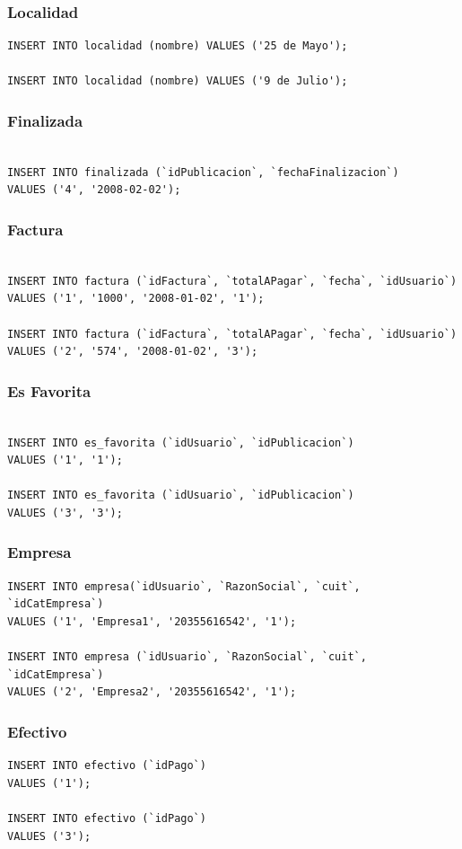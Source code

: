 \documentclass[a4paper, 10pt, twoside]{article}
\begin{document}
\subsubsection{Localidad}
\begin{verbatim}
INSERT INTO localidad (nombre) VALUES ('25 de Mayo');

INSERT INTO localidad (nombre) VALUES ('9 de Julio');
\end{verbatim}
\subsubsection{Finalizada}
\begin{verbatim}

INSERT INTO finalizada (`idPublicacion`, `fechaFinalizacion`) 
VALUES ('4', '2008-02-02');
\end{verbatim}
\newpage
\subsubsection{Factura}
\begin{verbatim}

INSERT INTO factura (`idFactura`, `totalAPagar`, `fecha`, `idUsuario`) 
VALUES ('1', '1000', '2008-01-02', '1');

INSERT INTO factura (`idFactura`, `totalAPagar`, `fecha`, `idUsuario`) 
VALUES ('2', '574', '2008-01-02', '3');
\end{verbatim}
\subsubsection{Es Favorita}
\begin{verbatim}

INSERT INTO es_favorita (`idUsuario`, `idPublicacion`) 
VALUES ('1', '1');

INSERT INTO es_favorita (`idUsuario`, `idPublicacion`) 
VALUES ('3', '3');
\end{verbatim}
\subsubsection{Empresa}
\begin{verbatim}
INSERT INTO empresa(`idUsuario`, `RazonSocial`, `cuit`, `idCatEmpresa`) 
VALUES ('1', 'Empresa1', '20355616542', '1');

INSERT INTO empresa (`idUsuario`, `RazonSocial`, `cuit`, `idCatEmpresa`) 
VALUES ('2', 'Empresa2', '20355616542', '1');
\end{verbatim}
\subsubsection{Efectivo}
\begin{verbatim}
INSERT INTO efectivo (`idPago`) 
VALUES ('1');

INSERT INTO efectivo (`idPago`) 
VALUES ('3');
\end{verbatim}
\end{document}
